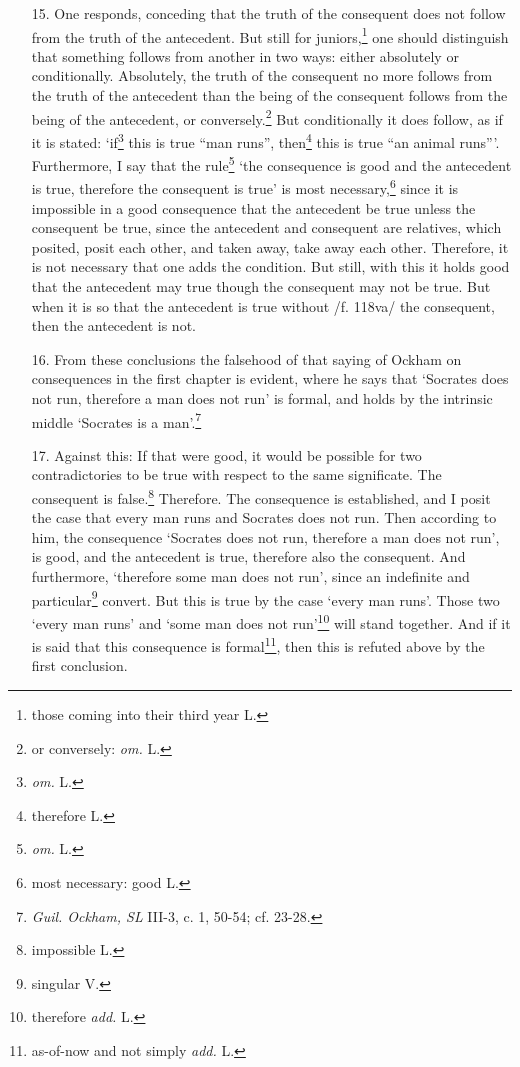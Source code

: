 \documentclass[]{article}
\begin{document}
\begin{enumerate}
	\item[15.] One responds, conceding that the truth of the consequent does not follow from the truth of the antecedent. But still for juniors,\footnote{those coming into their third year L.} one should distinguish that something follows from another in two ways: either absolutely or conditionally. Absolutely, the truth of the consequent no more follows from the truth of the antecedent than the being of the consequent follows from the being of the antecedent, or conversely.\footnote{or conversely: \textit{om.} L.} But conditionally it does follow, as if it is stated: `if\footnote{\textit{om.} L.} this is true ``man runs'', then\footnote{therefore L.} this is true ``an animal runs'''. Furthermore, I say that the rule\footnote{\textit{om.} L.} `the consequence is good and the antecedent is true, therefore the consequent is true' is most necessary,\footnote{most necessary: good L.} since it is impossible in a good consequence that the antecedent be true unless the consequent be true, since the antecedent and consequent are relatives, which posited, posit each other, and taken away, take away each other. Therefore, it is not necessary that one adds the condition. But still, with this it holds good that the antecedent may true though the consequent may not be true. But when it is so that the antecedent is true without /f. 118va/ the consequent, then the antecedent is not.
	\item[16.] From these conclusions the falsehood of that saying of Ockham on consequences in the first chapter is evident, where he says that `Socrates does not run, therefore a man does not run' is formal, and holds by the intrinsic middle `Socrates is a man'.\footnote{\textit{Guil. Ockham, SL} III-3, c. 1, 50-54; cf. 23-28.}
	\item[17.] Against this: If that were good, it would be possible for two contradictories to be true with respect to the same significate. The consequent is false.\footnote{impossible L.} Therefore. The consequence is established, and I posit the case that every man runs and Socrates does not run. Then according to him, the consequence `Socrates does not run, therefore a man does not run', is good, and the antecedent is true, therefore also the consequent. And furthermore, `therefore some man does not run', since an indefinite and particular\footnote{singular V.} convert. But this is true by the case `every man runs'. Those two `every man runs' and `some man does not run'\footnote{therefore \textit{add.} L.} will stand together. And if it is said that this consequence is formal\footnote{as-of-now and not simply \textit{add.} L.}, then this is refuted above by the first conclusion. 
\end{enumerate}
\end{document}

